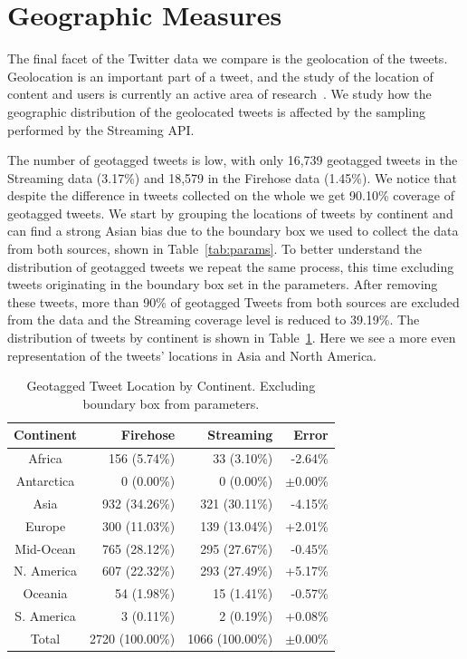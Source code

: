\documentclass[letterpaper]{article}
\begin{document}
\section{Geographic Measures}
The final facet of the Twitter data we compare is the geolocation of the tweets. Geolocation is an important part of a tweet, and the study of the location of content and users is currently an active area of research~\cite{Chen10,Waka11}. We study how the geographic distribution of the geolocated tweets is affected by the sampling performed by the Streaming API.

The number of geotagged tweets is low, with only 16,739 geotagged tweets in the Streaming data (3.17\%) and 18,579 in the Firehose data (1.45\%). We notice that despite the difference in tweets collected on the whole we get 90.10\% coverage of geotagged tweets. We start by grouping the locations of tweets by continent and can find a strong Asian bias due to the boundary box we used to collect the data from both sources, shown in Table~\ref{tab:params}. To better understand the distribution of geotagged tweets we repeat the same process, this time excluding tweets originating in the boundary box set in the parameters. After removing these tweets, more than 90\% of geotagged Tweets from both sources are excluded from the data and the Streaming coverage level is reduced to 39.19\%. The distribution of tweets by continent is shown in Table~\ref{tab:geocontnobox}. Here we see a more even representation of the tweets' locations in Asia and North America. 

\begin{table}
  \caption{Geotagged Tweet Location by Continent. Excluding boundary box from parameters.}
  \renewcommand{\arraystretch}{1.2}
  \small \begin{tabular}{| c | r | r | r |}
  \hline
  Continent & Firehose & Streaming & Error \\
  \hline
  Africa & 156 \small(5.74\%) & 33 \small(3.10\%) & -2.64\% \\
  Antarctica & 0 \small(0.00\%) & 0 \small(0.00\%) & $\pm$0.00\% \\
  Asia & 932 \small(34.26\%) & 321 \small(30.11\%) & -4.15\% \\
  Europe & 300 \small(11.03\%) & 139 \small(13.04\%) & +2.01\% \\
  Mid-Ocean & 765 \small(28.12\%) & 295 \small(27.67\%) & -0.45\% \\
  N. America & 607 \small(22.32\%) & 293 \small(27.49\%) & +5.17\% \\
  Oceania & 54 \small(1.98\%) & 15 \small(1.41\%) & -0.57\% \\
  S. America & 3 \small(0.11\%) & 2 \small(0.19\%) & +0.08\% \\
  \hline
  Total & 2720 \small(100.00\%) & 1066 \small(100.00\%) & $\pm$0.00\% \\
  \hline
  \hline
  \end{tabular}
  \vspace{-.2in}
  \label{tab:geocontnobox}
\end{table}
\end{document}
